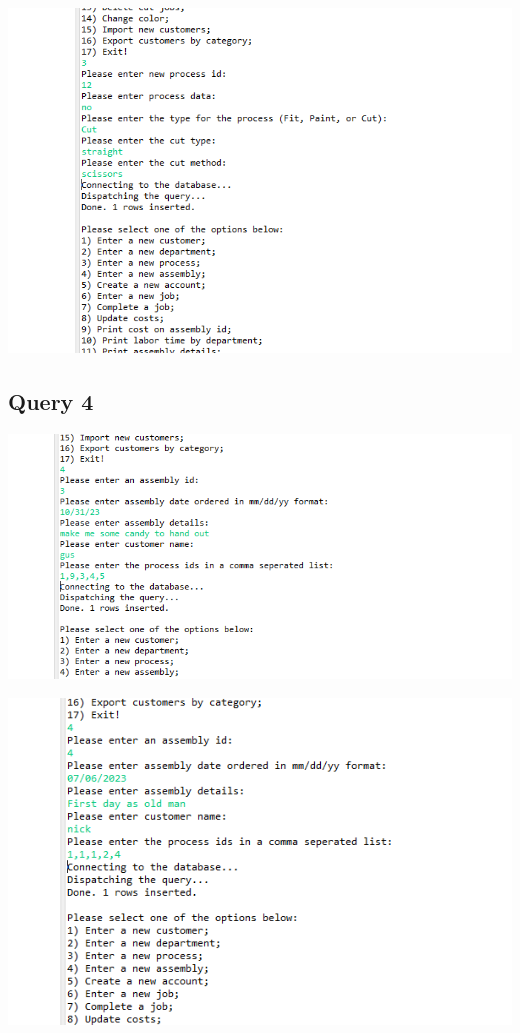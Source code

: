 \documentclass[11pt]{article}
\begin{document}
\includegraphics[width = \textwidth]{insertProcess6.png}
\subsection{Query 4}%

\includegraphics[width = \textwidth]{ass1.png}

\includegraphics[width = \textwidth]{ass2.png}
\end{document}
